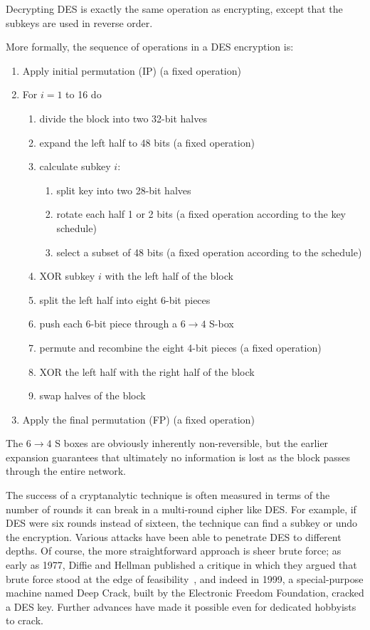 Decrypting DES is exactly the same operation as encrypting, except
that the subkeys are used in reverse order.

More formally, the sequence of operations in a DES encryption
is:

\begin{enumerate}
\item Apply initial permutation (IP) (a fixed operation)
\item For $i = 1$ to 16 do
  \begin{enumerate}
  \item divide the block into two 32-bit halves
  \item expand the left half to 48 bits (a fixed operation)
  \item calculate subkey $i$:
    \begin{enumerate}
    \item split key into two 28-bit halves
    \item rotate each half 1 or 2 bits (a fixed operation according to
      the key schedule)
    \item select a subset of 48 bits (a fixed operation according to
      the schedule)
    \end{enumerate}
  \item XOR subkey $i$ with the left half of the block 
  \item split the left half into eight 6-bit pieces
  \item push each 6-bit piece through a $6\rightarrow 4$ S-box
  \item permute and recombine the eight 4-bit pieces (a fixed operation)
  \item XOR the left half with the right half of the block
  \item swap halves of the block
  \end{enumerate}
\item Apply the final permutation (FP) (a fixed operation)
\end{enumerate}

The $6 \rightarrow 4$ S boxes are obviously inherently non-reversible,
but the earlier expansion guarantees that ultimately no information is
lost as the block passes through the entire network.

  The success of
a cryptanalytic technique is often measured in terms of the number of
rounds it can break in a multi-round cipher like DES.  For example, if
DES were six rounds instead of sixteen, the technique can find a
subkey or undo the encryption.  Various attacks have been able to
penetrate DES to different depths.  Of course, the more
straightforward approach is sheer brute force; as early as 1977,
Diffie and Hellman published a critique in which they argued that
brute force stood at the edge of feasibility~\cite{diffie1977special},
and indeed in 1999, a special-purpose machine named Deep Crack, built
by the Electronic Freedom Foundation, cracked a DES key.  Further
advances have made it possible even for dedicated hobbyists to crack.

